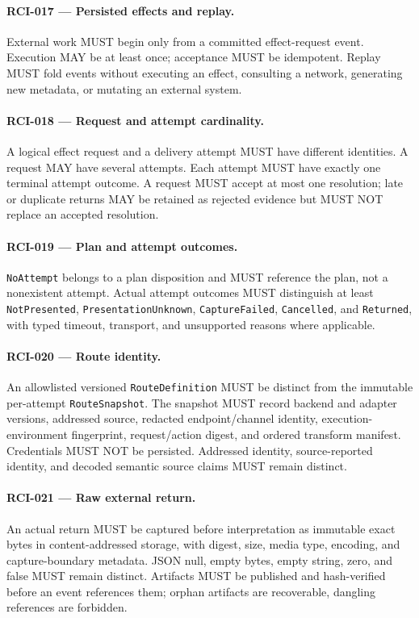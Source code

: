 \documentclass[11pt]{article}
\begin{document}
\paragraph{RCI-017 --- Persisted effects and replay.}
External work MUST begin only from a committed effect-request event. Execution
MAY be at least once; acceptance MUST be idempotent. Replay MUST fold events
without executing an effect, consulting a network, generating new metadata, or
mutating an external system.

\paragraph{RCI-018 --- Request and attempt cardinality.}
A logical effect request and a delivery attempt MUST have different identities.
A request MAY have several attempts. Each attempt MUST have exactly one
terminal attempt outcome. A request MUST accept at most one resolution; late or
duplicate returns MAY be retained as rejected evidence but MUST NOT replace an
accepted resolution.

\paragraph{RCI-019 --- Plan and attempt outcomes.}
\texttt{NoAttempt} belongs to a plan disposition and MUST reference the plan,
not a nonexistent attempt. Actual attempt outcomes MUST distinguish at least
\texttt{NotPresented}, \texttt{PresentationUnknown}, \texttt{CaptureFailed},
\texttt{Cancelled}, and \texttt{Returned}, with typed timeout, transport, and
unsupported reasons where applicable.

\paragraph{RCI-020 --- Route identity.}
An allowlisted versioned \texttt{RouteDefinition} MUST be distinct from the
immutable per-attempt \texttt{RouteSnapshot}. The snapshot MUST record backend
and adapter versions, addressed source, redacted endpoint/channel identity,
execution-environment fingerprint, request/action digest, and ordered transform
manifest. Credentials MUST NOT be persisted. Addressed identity, source-reported
identity, and decoded semantic source claims MUST remain distinct.

\paragraph{RCI-021 --- Raw external return.}
An actual return MUST be captured before interpretation as immutable exact
bytes in content-addressed storage, with digest, size, media type, encoding, and
capture-boundary metadata. JSON null, empty bytes, empty string, zero, and false
MUST remain distinct. Artifacts MUST be published and hash-verified before an
event references them; orphan artifacts are recoverable, dangling references
are forbidden.
\end{document}
